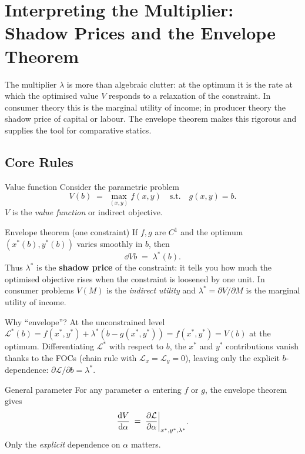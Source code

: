 \chapter{Interpreting the Multiplier: Shadow Prices and the Envelope Theorem}

The multiplier $\lambda$ is more than algebraic clutter: at the optimum
it is the rate at which the optimised value $V$ responds to a relaxation of
the constraint. In consumer theory this is the marginal utility of income;
in producer theory the shadow price of capital or labour. The envelope
theorem makes this rigorous and supplies the tool for comparative statics.

\section{Core Rules}

\begin{rulebox}{Value function}
Consider the parametric problem
\[
V(b) \;=\; \max_{(x, y)} f(x, y) \quad \text{s.t.} \quad g(x, y) = b.
\]
$V$ is the \emph{value function} or indirect objective.
\end{rulebox}

\begin{rulebox}{Envelope theorem (one constraint)}
If $f, g$ are $C^1$ and the optimum $(x^*(b), y^*(b))$ varies smoothly in
$b$, then
\[
\dd{V}{b} \;=\; \lambda^*(b).
\]
Thus $\lambda^*$ is the \textbf{shadow price} of the constraint: it tells
you how much the optimised objective rises when the constraint is loosened
by one unit. In consumer problems $V(M)$ is the \emph{indirect utility} and
$\lambda^* = \partial V/\partial M$ is the marginal utility of income.
\end{rulebox}

\begin{rulebox}{Why ``envelope''?}
At the unconstrained level
$\mathcal{L}^*(b) = f(x^*, y^*) + \lambda^*(b - g(x^*, y^*)) = f(x^*, y^*)
= V(b)$ at the optimum. Differentiating $\mathcal{L}^*$ with respect to
$b$, the $x^*$ and $y^*$ contributions vanish thanks to the FOCs (chain
rule with $\mathcal{L}_x = \mathcal{L}_y = 0$), leaving only the explicit
$b$-dependence: $\partial \mathcal{L}/\partial b = \lambda^*$.
\end{rulebox}

\begin{rulebox}{General parameter}
For any parameter $\alpha$ entering $f$ or $g$, the envelope theorem gives
\[
\frac{\mathrm{d}V}{\mathrm{d}\alpha} \;=\; \frac{\partial \mathcal{L}}{\partial \alpha}\bigg|_{x^*, y^*, \lambda^*}.
\]
Only the \emph{explicit} dependence on $\alpha$ matters.
\end{rulebox}

